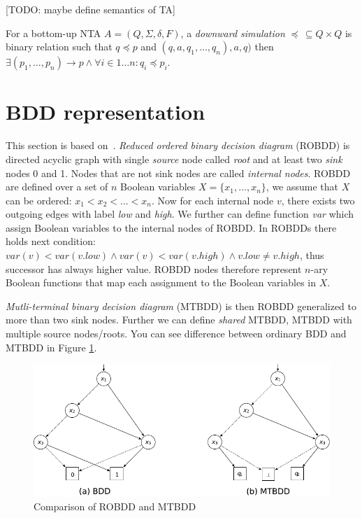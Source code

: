 \documentclass[a4paper, 12pt]{article}
\begin{document}
[TODO: maybe define semantics of TA]


For a bottom-up NTA $A=(Q, \Sigma, \delta, F)$, a \emph{downward simulation} $\preceq\, \subseteq Q\times Q$ is binary relation such that $q \preceq p$
and $(q,a,q_1,\ldots, q_n),a,q)$ then $\exists (p_1, \ldots, p_n) \rightarrow p \wedge \forall i \in {1 \ldots n}: q_i \preceq p_i$.

\section{BDD representation}
\label{sec:bdd}

This section is based on~\cite{fiedor:wsks}. \textit{Reduced ordered binary decision diagram} (ROBDD) is directed acyclic graph with single \textit{source} node called \textit{root} and at least two \textit{sink} nodes 0 and 1. Nodes that are not sink nodes are called \textit{internal nodes}. ROBDD are defined over a set of $n$ Boolean variables $X = \{x_1, \dots, x_n\}$, we assume that $X$ can be ordered: $x_1 < x_2 < \dots < x_n$. Now for each internal node $v$, there exists two outgoing edges with label \textit{low} and \textit{high}. We further can define function \textit{var} which assign Boolean variables to the internal nodes of ROBDD. In ROBDDs there holds next condition: $var(v) < var(v.low) \wedge var(v) < var(v.high) \wedge v.low \neq v.high$, thus successor has always higher value. ROBDD nodes therefore represent $n$-ary Boolean functions that map each assignment to the Boolean variables in $X$.

\textit{Mutli-terminal binary decision diagram} (MTBDD) is then ROBDD generalized to more than two sink nodes. Further we can define \textit{shared} MTBDD, MTBDD with multiple source nodes/roots. You can see difference between ordinary BDD and MTBDD in Figure \ref{fig:15860}.

\begin{figure}[h]
	\centering
	\includegraphics[width=0.7\linewidth]{15860.pdf}
	\caption{Comparison of ROBDD and MTBDD \cite{fiedor:wsks}}
	\label{fig:15860}
\end{figure}
\end{document}
